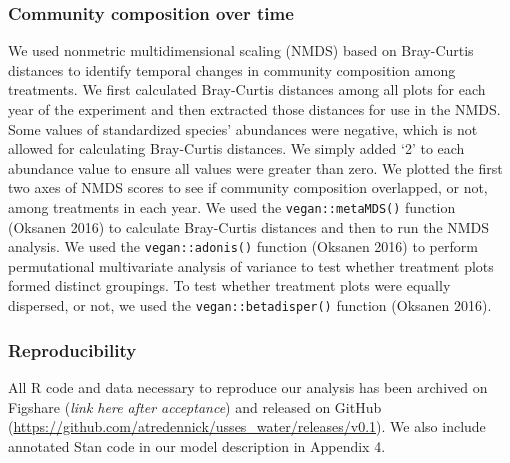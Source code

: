 \documentclass[fleqn,10pt,lineno]{wlpeerj} %
\begin{document}
\hypertarget{community-composition-over-time}{%
\subsubsection{Community composition over
time}\label{community-composition-over-time}}

We used nonmetric multidimensional scaling (NMDS) based on Bray-Curtis
distances to identify temporal changes in community composition among
treatments. We first calculated Bray-Curtis distances among all plots
for each year of the experiment and then extracted those distances for
use in the NMDS. Some values of standardized species' abundances were
negative, which is not allowed for calculating Bray-Curtis distances. We
simply added `2' to each abundance value to ensure all values were
greater than zero. We plotted the first two axes of NMDS scores to see
if community composition overlapped, or not, among treatments in each
year. We used the \texttt{vegan::metaMDS()} function (Oksanen 2016) to
calculate Bray-Curtis distances and then to run the NMDS analysis. We
used the \texttt{vegan::adonis()} function (Oksanen 2016) to perform
permutational multivariate analysis of variance to test whether
treatment plots formed distinct groupings. To test whether treatment
plots were equally dispersed, or not, we used the
\texttt{vegan::betadisper()} function (Oksanen 2016).


\hypertarget{reproducibility}{%
\subsubsection{Reproducibility}\label{reproducibility}}

All R code and data necessary to reproduce our analysis has been
archived on Figshare (\emph{link here after acceptance}) and released on
GitHub (\url{https://github.com/atredennick/usses_water/releases/v0.1}).
We also include annotated Stan code in our model description in Appendix
4.
\end{document}

